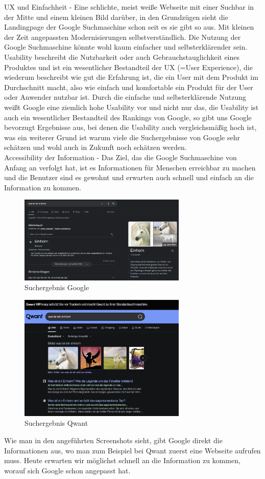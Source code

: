 UX und Einfachheit - Eine schlichte, meist weiße Webseite mit einer Suchbar in der Mitte und einem kleinen Bild darüber,
in den Grundzügen sieht die Landingpage der Google Suchmaschine schon seit es sie gibt so aus.
Mit kleinen der Zeit angepassten Modernisierungen selbstverständlich.
Die Nutzung der Google Suchmaschine könnte wohl kaum einfacher und selbsterklärender sein.
Usability beschreibt die Nutzbarkeit oder auch Gebrauchstauglichkeit eines Produktes und ist ein wesentlicher Bestandteil der UX (=User Experience),
die wiederum beschreibt wie gut die Erfahrung ist, die ein User mit dem Produkt im Durchschnitt macht, also wie einfach und komfortable ein Produkt für der User oder Anwender nutzbar ist.\cite{Maulhardt.20220621}
Durch die einfache und selbsterklärende Nutzung weißt Google eine ziemlich hohe Usability vor und nicht nur das,
die Usability ist auch ein wesentlicher Bestandteil des Rankings von Google, so gibt uns Google bevorzugt Ergebnisse aus, bei denen die Usability auch vergleichsmäßig hoch ist,
was ein weiterer Grund ist warum viele die Suchergebnisse von Google sehr schätzen und wohl auch in Zukunft noch schätzen werden.\cite{LIC15}\\

Accessibility der Information - Das Ziel, das die Google Suchmaschine von Anfang an verfolgt hat,
ist es Informationen für Menschen erreichbar zu machen und die Benutzer sind es gewohnt und erwarten auch schnell und einfach an die Information zu kommen.
\begin{figure}[h]
    \centering
    \includegraphics[width=80mm]{images/screenshot_googleQue}
    \caption{Suchergebnis Google}
    \label{fig:screenshotGoogleQue}
\end{figure}
\begin{figure}[h]
    \centering
    \includegraphics[width=80mm]{images/screenshot_qwantQue}
    \caption{Suchergebnis Qwant}
    \label{fig:screenshotQwantQue}
\end{figure}
Wie man in den angeführten Screenshots sieht, gibt Google direkt die Informationen aus, wo man zum Beispiel bei Qwant zuerst eine Webseite aufrufen muss.
Heute erwarten wir möglichst schnell an die Information zu kommen, worauf sich Google schon angepasst hat.
